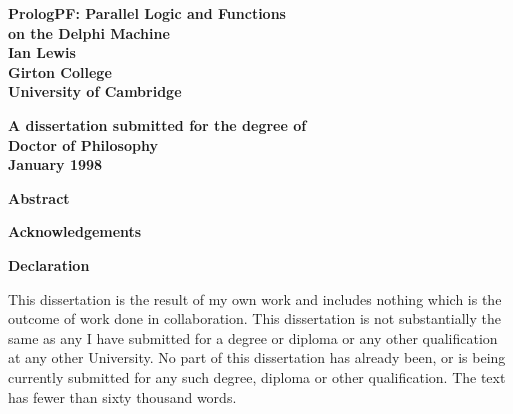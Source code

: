 \pagestyle{empty}


{  \begin{center}
\vspace*{\fill}
\LARGE\bf 
PrologPF: Parallel Logic and Functions\\ on the Delphi Machine \\
\vfill
\vfill
\vfill
\Large
 \bf Ian Lewis\\[6mm]
Girton College\\
University of Cambridge\\
\vfill
\centerline{}
\vfill
\large \bf
A dissertation submitted for the degree of\\
Doctor of Philosophy\\[4mm]
January 1998\\ %
\vspace*{\fill}
\end{center}
}


\cleardoublepage
\pagestyle{plain}

{\bf \Huge Abstract}

\vspace{12pt}



\cleardoublepage

\vfill 
\vfill
{\bf \Huge Acknowledgements}

\vspace{15pt}




\newpage
{\bf \Huge Declaration}

\vspace{10pt}
This dissertation is the
result of my own work and includes nothing which is
the outcome of work done in
collaboration. This dissertation is not substantially the same as any
I have submitted for a degree or diploma or any other qualification at
any other University. No part of this dissertation has already been,
or is being currently submitted for any such degree, diploma or other
qualification.  The text has fewer than sixty thousand words.


